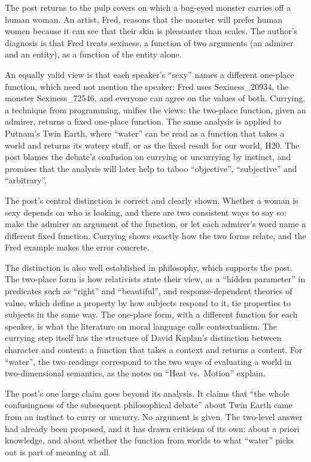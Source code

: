 \begin{afterword}
\summaryhead

The post returns to the pulp covers on which a bug-eyed monster carries off a human woman. An artist, Fred, reasons that the monster will prefer human women because it can see that their skin is pleasanter than scales. The author's diagnosis is that Fred treats sexiness, a function of two arguments (an admirer and an entity), as a function of the entity alone.

An equally valid view is that each speaker's ``sexy'' names a different one-place function, which need not mention the speaker: Fred uses Sexiness\_20934, the monster Sexiness\_72546, and everyone can agree on the values of both. Currying, a technique from programming, unifies the views: the two-place function, given an admirer, returns a fixed one-place function. The same analysis is applied to Putnam's Twin Earth, where ``water'' can be read as a function that takes a world and returns its watery stuff, or as the fixed result for our world, H20. The post blames the debate's confusion on currying or uncurrying by instinct, and promises that the analysis will later help to taboo ``objective'', ``subjective'' and ``arbitrary''.

\responsehead

The post's central distinction is correct and clearly shown. Whether a woman is sexy depends on who is looking, and there are two consistent ways to say so: make the admirer an argument of the function, or let each admirer's word name a different fixed function. Currying shows exactly how the two forms relate, and the Fred example makes the error concrete.

The distinction is also well established in philosophy, which supports the post. The two-place form is how relativists state their view, as a ``hidden parameter'' in predicates such as ``right'' and ``beautiful'', and response-dependent theories of value, which define a property by how subjects respond to it, tie properties to subjects in the same way. The one-place form, with a different function for each speaker, is what the literature on moral language calls contextualism. The currying step itself has the structure of David Kaplan's distinction between character and content: a function that takes a context and returns a content. For ``water'', the two readings correspond to the two ways of evaluating a world in two-dimensional semantics, as the notes on ``Heat vs.\ Motion'' explain.

The post's one large claim goes beyond its analysis. It claims that ``the whole confusingness of the subsequent philosophical debate'' about Twin Earth came from an instinct to curry or uncurry. No argument is given. The two-level answer had already been proposed, and it has drawn criticism of its own: about a priori knowledge, and about whether the function from worlds to what ``water'' picks out is part of meaning at all.


\end{afterword}
